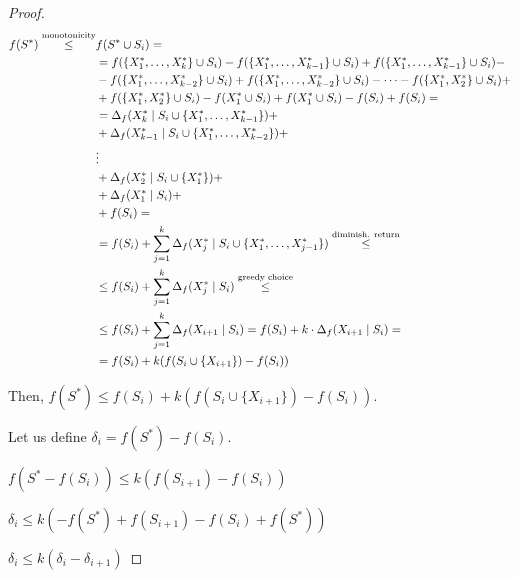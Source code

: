 \begin{proof}
        \begin{equation*}
            \begin{split}
                f(S^*) \overset{\text{monotonicity}}{\leq} & f(S^* \cup S_i) =\\
                    &= f(\{ X_1^*, \dots, X_k^* \} \cup S_i) - f(\{ X_1^*, \dots, X_{k-1}^*\} \cup S_i) + f(\{ X_1^*, \dots, X_{k-1}^* \} \cup S_i) -\\
                    &- f(\{ X_1^*, \dots, X_{k-2}^* \} \cup S_i)  + f(\{ X_1^*, \dots, X_{k-2}^* \} \cup S_i)  - \cdots - f(\{ X_1^*, X_2^*\} \cup S_i) + \\
                    &+ f(\{ X_1^*, X_2^*\} \cup S_i)  - f({X_1^*} \cup S_i) + f({X_1^*} \cup S_i) - f(S_i) + f(S_i) =\\
                    &= \Delta_f(X_{k}^* \; \vert \; S_i \cup \{ X_1^*, \dots, X_{k-1}^* \}) +\\
                    &+ \Delta_f(X_{k-1}^* \; \vert \; S_i \cup \{ X_1^*, \dots, X_{k-2}^* \}) +\\
                    & \vdots\\
                    &+ \Delta_f(X_{2}^* \; \vert \; S_i \cup \{ X_1^*\}) +\\
                    &+ \Delta_f(X_{1}^* \; \vert \; S_i) +\\
                    &+ f(S_i) =\\
                    &= f(S_i) + \sum_{j=1}^{k} \Delta_f(X_j^* \; \vert \; S_i \cup \{ X_1^*, \dots, X_{j-1}^* \}) \overset{\text{diminish. return}}{\leq}\\
                    &\leq f(S_i) + \sum_{j=1}^{k} \Delta_f(X_j^* \; \vert \; S_i) \overset{\text{greedy choice}}{\leq}\\
                    &\leq f(S_i) + \sum_{j=1}^{k} \Delta_f(X_{i+1} \; \vert \; S_i) = f(S_i) + k \cdot \Delta_f(X_{i+1} \; \vert \; S_i) =\\
                    &= f(S_i) + k (f(S_i \cup \{ X_{i+1} \}) - f(S_i))
            \end{split}
        \end{equation*}

        Then, $f(S^*) \leq f(S_i) + k (f(S_i \cup \{ X_{i+1} \}) - f(S_i))$.

        Let us define $\delta_i = f(S^*) - f(S_i)$.

        $f(S^* - f(S_i)) \leq k (f(S_{i+1}) - f(S_i))$

        $\delta_i \leq k (-f(S^*) + f(S_{i+1}) - f(S_i) + f(S^*))$

        $\delta_i \leq k (\delta_i - \delta_{i+1})$


\end{proof}
